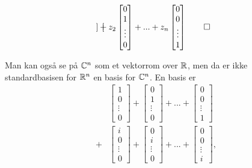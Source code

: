 \begin{ex}
\begin{align*}
\begin{bmatrix}
\end{bmatrix}
+
z_2
\begin{bmatrix}
0    \\ 1  \\ \vdots \\ 0
\end{bmatrix}
+...+
z_n
\begin{bmatrix}
0    \\ 0  \\ \vdots \\ 1
\end{bmatrix} \qedhere
\end{align*}
\end{ex}

\begin{ex}
Man kan også se på $\mathbb{C}^n$ som et vektorrom over $\mathbb{R}$, men da er ikke standardbasisen for $\mathbb{R}^n$ en basis for $\mathbb{C}^n$. En basis er
\begin{align*}
&
\begin{bmatrix}
1    \\ 0  \\ \vdots \\ 0
\end{bmatrix}
+
\begin{bmatrix}
0    \\ 1  \\ \vdots \\ 0
\end{bmatrix}
+...+
\begin{bmatrix}
0    \\ 0  \\ \vdots \\ 1
\end{bmatrix}
\\ +
&
\begin{bmatrix}
i    \\ 0  \\ \vdots \\ 0
\end{bmatrix}
+
\begin{bmatrix}
0    \\ i  \\ \vdots \\ 0
\end{bmatrix}
+...+
\begin{bmatrix}
0    \\ 0  \\ \vdots \\ i
\end{bmatrix},
\end{align*}

\end{ex}
